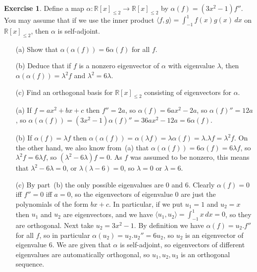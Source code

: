 \documentclass{amsart}
\newcommand{\R}         {{\mathbb{R}}}
\newcommand{\al}        {\alpha}
\newcommand{\lm}        {\lambda}
\newcommand{\ip}[1]     {\langle #1\rangle}
\renewcommand{\:}       {\colon}
\theoremstyle{definition}
\newtheorem{exercise}{Exercise}[section]
\renewenvironment{solution}{\SolutionAtEnd}{\endSolutionAtEnd}
\begin{document}
\begin{exercise}
 Define a map $\al\:\R[x]_{\leq 2}\to\R[x]_{\leq 2}$ by
 $\al(f)=(3x^2-1)f''$.  You may assume that if we use the inner
 product $\ip{f,g}=\int_{-1}^1 f(x)g(x)\,dx$ on $\R[x]_{\leq 2}$, then
 $\al$ is self-adjoint.
 \begin{itemize}
  \item[(a)] Show that $\al(\al(f))=6\al(f)$ for all $f$.
  \item[(b)] Deduce that if $f$ is a nonzero eigenvector of $\al$ with
   eigenvalue $\lm$, then $\al(\al(f))=\lm^2f$ and $\lm^2=6\lm$.
  \item[(c)] Find an orthogonal basis for $\R[x]_{\leq 2}$ consisting
   of eigenvectors for $\al$.
 \end{itemize}
\end{exercise}
\begin{solution}
 \begin{itemize}
  \item[(a)] If $f=ax^2+bx+c$ then $f''=2a$, so $\al(f)=6ax^2-2a$, so
   $\al(f)''=12a$, so
   $\al(\al(f))=(3x^2-1)\al(f)''=36ax^2-12a=6\al(f)$.
  \item[(b)] If $\al(f)=\lm f$ then
   $\al(\al(f))=\al(\lm f)=\lm\al(f)=\lm.\lm f=\lm^2 f$.  On the other
   hand, we also know from~(a) that $\al(\al(f))=6\al(f)=6\lm f$, so
   $\lm^2 f=6\lm f$, so $(\lm^2-6\lm)f=0$.  As $f$ was assumed to be
   nonzero, this means that $\lm^2-6\lm=0$, or $\lm(\lm-6)=0$, so
   $\lm=0$ or $\lm=6$.
  \item[(c)] By part~(b) the only possible eigenvalues are $0$ and
   $6$.  Clearly $\al(f)=0$ iff $f''=0$ iff $a=0$, so the eigenvectors
   of eigenvalue $0$ are just the polynomials of the form $bx+c$.
   In particular, if we put $u_1=1$ and $u_2=x$ then $u_1$ and $u_2$
   are eigenvectors, and we have $\ip{u_1,u_2}=\int_{-1}^1 x\,dx=0$,
   so they are orthogonal.  Next take $u_2=3x^2-1$.  By definition
   we have $\al(f)=u_2.f''$ for all $f$, so in particular
   $\al(u_2)=u_2.u_2''=6u_2$, so $u_2$ is an eigenvector of eigenvalue
   $6$.  We are given that $\al$ is self-adjoint, so eigenvectors of
   different eigenvalues are automatically orthogonal, so
   $u_1,u_2,u_3$ is an orthogonal sequence.  
 \end{itemize}
\end{solution}
\end{document}
